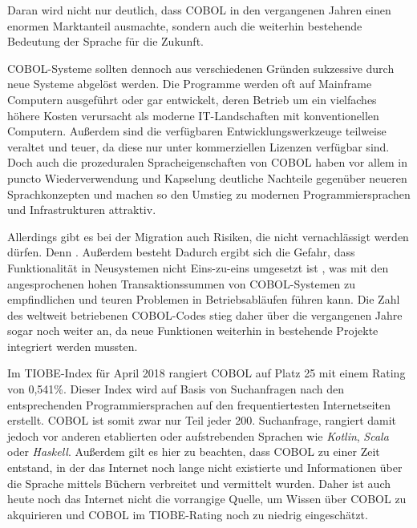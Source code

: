 Daran wird nicht nur deutlich, dass COBOL in den vergangenen Jahren einen enormen Marktanteil ausmachte, sondern auch die weiterhin bestehende Bedeutung der Sprache für die Zukunft.

COBOL-Systeme sollten dennoch aus verschiedenen Gründen sukzessive durch neue Systeme abgelöst werden. Die Programme werden oft auf Mainframe Computern ausgeführt oder gar entwickelt, deren Betrieb um ein vielfaches höhere Kosten verursacht als moderne IT-Landschaften mit konventionellen Computern. Außerdem sind die verfügbaren Entwicklungswerkzeuge teilweise veraltet und teuer, da diese nur unter kommerziellen Lizenzen verfügbar sind. Doch auch die prozeduralen Spracheigenschaften von COBOL haben vor allem in puncto Wiederverwendung und Kapselung deutliche Nachteile gegenüber neueren Sprachkonzepten und machen so den Umstieg zu modernen Programmiersprachen und Infrastrukturen attraktiv.

Allerdings gibt es bei der Migration auch Risiken, die nicht vernachlässigt werden dürfen. Denn  \cite{beat_balzli_cobol-programmierer_2017}. 
Außerdem besteht  \cite{sneed_softwaremigration_2010}
Dadurch ergibt sich die Gefahr, dass Funktionalität in Neusystemen nicht Eins-zu-eins umgesetzt ist \cite{sneed_softwaremigration_2010}, was mit den angesprochenen hohen Transaktionssummen von COBOL-Systemen zu empfindlichen und teuren Problemen in Betriebsabläufen führen kann. Die Zahl des weltweit betriebenen COBOL-Codes stieg daher über die vergangenen Jahre sogar noch weiter an, da neue Funktionen weiterhin in bestehende Projekte integriert werden mussten.

Im TIOBE-Index \cite{_tiobe_} für April 2018 rangiert COBOL auf Platz 25 mit einem Rating von 0,541\%. Dieser Index wird auf Basis von Suchanfragen nach den entsprechenden Programmiersprachen auf den frequentiertesten Internetseiten erstellt. COBOL ist somit zwar nur Teil jeder 200. Suchanfrage, rangiert damit jedoch vor anderen etablierten oder aufstrebenden Sprachen wie \textit{Kotlin}, \textit{Scala} oder \textit{Haskell}. Außerdem gilt es hier zu beachten, dass COBOL zu einer Zeit entstand, in der das Internet noch lange nicht existierte und Informationen über die Sprache mittels Büchern verbreitet und vermittelt wurden. Daher ist auch heute noch das Internet nicht die vorrangige Quelle, um Wissen über COBOL zu akquirieren und COBOL im TIOBE-Rating noch zu niedrig eingeschätzt.


